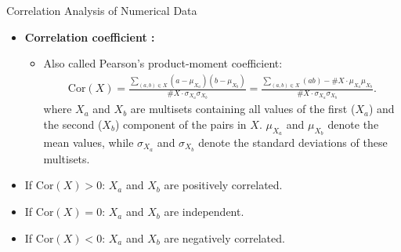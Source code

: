 \begin{frame}{Correlation Analysis of Numerical Data}
	\begin{itemize}
		\item \textbf{\color{airforceblue}Correlation coefficient :}
		\begin{itemize}
			\item Also called Pearson's product-moment coefficient:
			\begin{align}
				\text{Cor}(X) = \frac{\sum_{(a, b) \in X} 
				(a-\mu_{X_a})(b-\mu_{X_b})}{\#X\cdot\sigma_{X_a}\sigma_{X_b}} = 
				\frac{\sum_{(a, b) \in X}(a 
				b)-\#X\cdot\mu_{X_a}\mu_{X_b}}{\#X\cdot
				\sigma_{X_a}\sigma_{X_b}}. 
			\end{align}
			where $X_a$ and $X_b$ are multisets containing all values of the 
			first 
			($X_a$) and the second ($X_b$) component of the pairs in $X$.  
			$\mu_{X_a}$ and $\mu_{X_b}$ denote the mean values, while 
			$\sigma_{X_a}$ and $\sigma_{X_b}$ denote the standard 
			deviations of these multisets.
		\end{itemize}
		\item If $\text{Cor}(X) > 0$: $X_a$ and $X_b$ are positively 
		correlated.
		\item If $\text{Cor}(X) = 0$: $X_a$ and $X_b$ are independent.
		\item If $\text{Cor}(X) < 0$: $X_a$ and $X_b$ are negatively 
		correlated.
	\end{itemize}
\end{frame}

